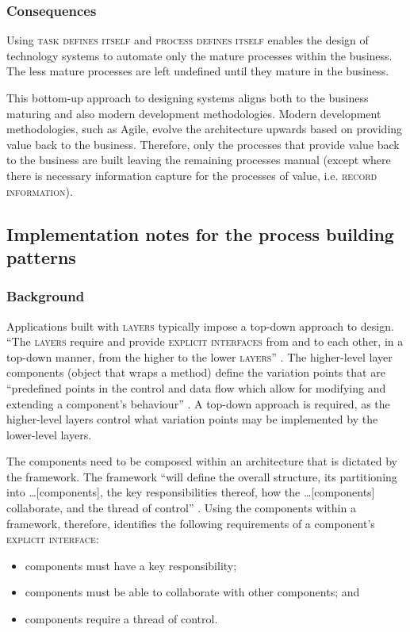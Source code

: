 \documentclass[prodmode]{style/acmlarge}
\begin{document}
\subsubsection*{Consequences} Using \textsc{task defines itself} and
\textsc{process defines itself} enables the design of technology systems to
automate only the mature processes within the business.  The less mature
processes are left undefined until they mature in the business.

This bottom-up approach to designing systems aligns both to the business
maturing and also modern development methodologies.  Modern development
methodologies, such as Agile, evolve the architecture upwards based on providing
value back to the business.  Therefore, only the processes that provide value
back to the business are built leaving the remaining processes manual (except
where there is necessary information capture for the processes of value, i.e.
\textsc{record information}).



\subsection{Implementation notes for the process building patterns}

\subsubsection*{Background}

Applications built with \textsc{layers} typically impose a top-down approach to
design.  ``The \textsc{layers} require and provide \textsc{explicit interfaces}
from and to each other, in a top-down manner, from the higher to the lower
\textsc{layers}'' \cite[p. 11]{ioc}.  The higher-level layer components (object
that wraps a method) define the variation points that are
``predefined points in the control and data flow which allow for modifying and
extending a component's behaviour'' \cite[p. 5]{ioc}.  A top-down approach is
required, as the higher-level layers control what variation points may be
implemented by the lower-level layers.

The components need to be composed within an architecture that is dictated by
the framework.  The framework ``will define the overall structure, its
partitioning into \ldots [components], the key responsibilities thereof, how the
\ldots [components] collaborate, and the thread of control'' \cite[p.26]{gof}.
Using the components within a framework, therefore, identifies the following
requirements of a component's \textsc{explicit interface}:
\begin{itemize}
  \item components must have a key responsibility;
  \item components must be able to collaborate with other components; and
  \item components require a thread of control.
\end{itemize}
\end{document}
